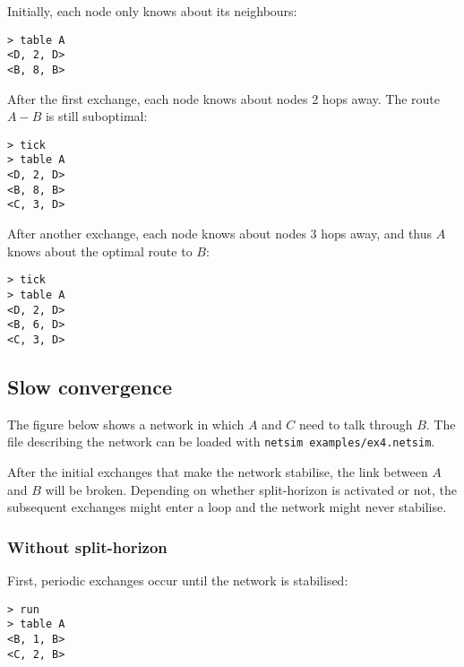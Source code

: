 \documentclass{scrartcl}
\begin{document}
Initially, each node only knows about its neighbours:
\begin{verbatim}
> table A
<D, 2, D>
<B, 8, B>
\end{verbatim}

After the first exchange, each node knows about nodes 2 hops away. The route
$A - B$ is still suboptimal:

\begin{verbatim}
> tick
> table A
<D, 2, D>
<B, 8, B>
<C, 3, D>
\end{verbatim}

After another exchange, each node knows about nodes 3 hops away, and thus $A$
knows about the optimal route to $B$:

\begin{verbatim}
> tick
> table A
<D, 2, D>
<B, 6, D>
<C, 3, D>
\end{verbatim}

\subsection{Slow convergence}

The figure below shows a network in which $A$ and $C$ need to talk through $B$.
The file describing the network can be loaded with \texttt{netsim
examples/ex4.netsim}.

After the initial exchanges that make the network stabilise, the link between
$A$ and $B$ will be broken. Depending on whether split-horizon is activated or
not, the subsequent exchanges might enter a loop and the network might never
stabilise.

\begin{figure}[h!]
\end{figure}

\subsubsection{Without split-horizon}

First, periodic exchanges occur until the network is stabilised:

\begin{verbatim}
> run
> table A
<B, 1, B>
<C, 2, B>
\end{verbatim}
\end{document}
